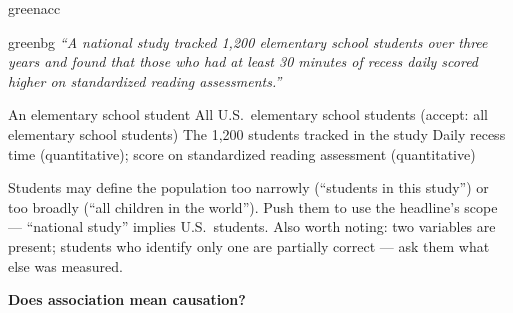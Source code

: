 \documentclass[10pt]{article}
\begin{document}
\begin{scenariobox}[Scenario 2]{greenacc}

\begin{headlinebox}{greenbg}
\small\textit{``A national study tracked 1{,}200 elementary school students over
three years and found that those who had at least 30 minutes of recess daily
scored higher on standardized reading assessments.''}
\end{headlinebox}

\vspace{8pt}
\componenttablekey
  {An elementary school student}
  {All U.S.\ elementary school students (accept: all elementary school students)}
  {The 1{,}200 students tracked in the study}
  {Daily recess time (quantitative); score on standardized reading assessment (quantitative)}

\vspace{6pt}
\begin{teachernote}
\scriptsize
Students may define the population too narrowly (``students in this study'') or too broadly
(``all children in the world''). Push them to use the headline's scope --- ``national study''
implies U.S.\ students. Also worth noting: two variables are present; students who identify
only one are partially correct --- ask them what else was measured.
\end{teachernote}

\vspace{8pt}
\small\textbf{Does association mean causation?}\\[4pt]

\end{scenariobox}

\vspace{0.12in}
\end{document}
